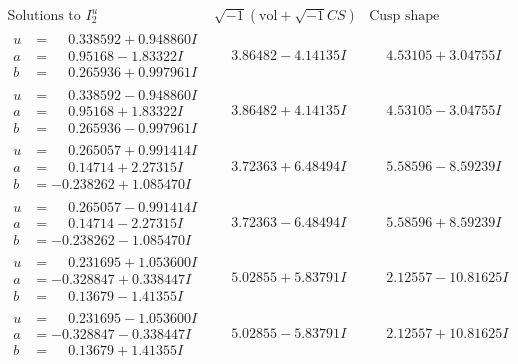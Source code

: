 \documentclass[1p]{elsarticle_modified}
\theoremstyle{definition}
\newcommand{\I}{\sqrt{-1}}
\begin{document}
$$\begin{array}{c|c|c}  
\text{Solutions to }I^u_{2}& \I (\text{vol} + \sqrt{-1}CS) & \text{Cusp shape}\\
 \hline 
\begin{aligned}
u &= \phantom{-}0.338592 + 0.948860 I \\
a &= \phantom{-}0.95168 - 1.83322 I \\
b &= \phantom{-}0.265936 + 0.997961 I\end{aligned}
 & \phantom{-}3.86482 - 4.14135 I & \phantom{-}4.53105 + 3.04755 I \\ \hline\begin{aligned}
u &= \phantom{-}0.338592 - 0.948860 I \\
a &= \phantom{-}0.95168 + 1.83322 I \\
b &= \phantom{-}0.265936 - 0.997961 I\end{aligned}
 & \phantom{-}3.86482 + 4.14135 I & \phantom{-}4.53105 - 3.04755 I \\ \hline\begin{aligned}
u &= \phantom{-}0.265057 + 0.991414 I \\
a &= \phantom{-}0.14714 + 2.27315 I \\
b &= -0.238262 + 1.085470 I\end{aligned}
 & \phantom{-}3.72363 + 6.48494 I & \phantom{-}5.58596 - 8.59239 I \\ \hline\begin{aligned}
u &= \phantom{-}0.265057 - 0.991414 I \\
a &= \phantom{-}0.14714 - 2.27315 I \\
b &= -0.238262 - 1.085470 I\end{aligned}
 & \phantom{-}3.72363 - 6.48494 I & \phantom{-}5.58596 + 8.59239 I \\ \hline\begin{aligned}
u &= \phantom{-}0.231695 + 1.053600 I \\
a &= -0.328847 + 0.338447 I \\
b &= \phantom{-}0.13679 - 1.41355 I\end{aligned}
 & \phantom{-}5.02855 + 5.83791 I & \phantom{-}2.12557 - 10.81625 I \\ \hline\begin{aligned}
u &= \phantom{-}0.231695 - 1.053600 I \\
a &= -0.328847 - 0.338447 I \\
b &= \phantom{-}0.13679 + 1.41355 I\end{aligned}
 & \phantom{-}5.02855 - 5.83791 I & \phantom{-}2.12557 + 10.81625 I \\ \hline\begin{aligned}

\end{aligned}
\end{array}$$
\end{document}
